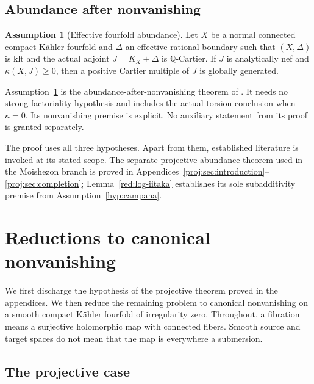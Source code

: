 \documentclass[11pt,letterpaper]{article}
\theoremstyle{definition}
\newtheorem{assumption}[theorem]{Assumption}
\theoremstyle{remark}
\begin{document}
\subsection{Abundance after nonvanishing}

\begin{assumption}[Effective fourfold abundance]
\label{hyp:effective-abundance}
Let \(X\) be a normal connected compact K\"ahler fourfold and
\(\Delta\) an effective rational boundary such that
\((X,\Delta)\) is klt and the actual adjoint
\(J=K_X+\Delta\) is \(\mathbb{Q}\)-Cartier. If \(J\) is analytically
nef and \(\kappa(X,J)\ge0\), then a positive Cartier multiple of
\(J\) is globally generated.
\end{assumption}

Assumption~\ref{hyp:effective-abundance} is the abundance-after-nonvanishing
theorem of \cite[Theorem~1.1]{GrantEffectiveAbundance}. It needs no strong
factoriality hypothesis and includes the actual torsion conclusion
when \(\kappa=0\). Its nonvanishing premise is explicit. No
auxiliary statement from its proof is granted separately.

The proof uses all three hypotheses. Apart from them, established
literature is invoked at its stated scope. The separate projective
abundance theorem used in the Moishezon branch is proved in
Appendices~\ref{proj:sec:introduction}--\ref{proj:sec:completion};
Lemma~\ref{red:log-iitaka} establishes its sole subadditivity premise
from Assumption~\ref{hyp:campana}.

\section{Reductions to canonical nonvanishing}
\label{red:section}

We first discharge the hypothesis of the projective theorem proved in
the appendices. We then reduce the remaining problem to canonical
nonvanishing on a smooth compact Kähler fourfold of irregularity zero.
Throughout, a fibration means a surjective holomorphic map with connected
fibers. Smooth source and target spaces do not mean that the map is
everywhere a submersion.

\subsection{The projective case}
\end{document}

